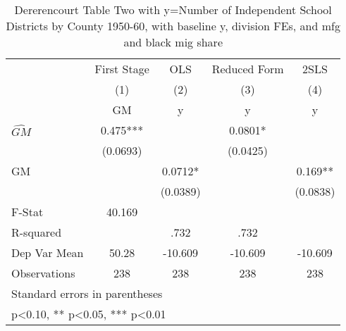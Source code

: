 \begin{table}[htbp]\centering
\def\sym#1{\ifmmode^{#1}\else\(^{#1}\)\fi}
\caption{Dererencourt Table Two with y=Number of Independent School Districts by County 1950-60, with baseline y, division FEs, and mfg and black mig share}
\begin{tabular}{l*{4}{c}}
\toprule
                    & First Stage   &         OLS   &Reduced Form   &        2SLS   \\
                    &\multicolumn{1}{c}{(1)}&\multicolumn{1}{c}{(2)}&\multicolumn{1}{c}{(3)}&\multicolumn{1}{c}{(4)}\\
                    &\multicolumn{1}{c}{GM}&\multicolumn{1}{c}{y}&\multicolumn{1}{c}{y}&\multicolumn{1}{c}{y}\\
\midrule
$\hat{GM}$          &       0.475***&               &      0.0801*  &               \\
                    &    (0.0693)   &               &    (0.0425)   &               \\
\addlinespace
GM                  &               &      0.0712*  &               &       0.169** \\
                    &               &    (0.0389)   &               &    (0.0838)   \\
\midrule
F-Stat              &      40.169   &               &               &               \\
R-squared           &               &        .732   &        .732   &               \\
Dep Var Mean        &       50.28   &     -10.609   &     -10.609   &     -10.609   \\
Observations        &         238   &         238   &         238   &         238   \\
\bottomrule
\multicolumn{5}{l}{\footnotesize Standard errors in parentheses}\\
\multicolumn{5}{l}{\footnotesize * p<0.10, ** p<0.05, *** p<0.01}\\
\end{tabular}
\end{table}
